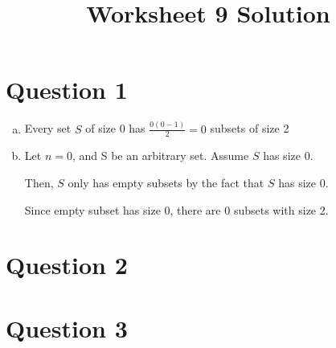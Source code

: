 \documentclass[12pt]{article}
\begin{document}
\title{Worksheet 9 Solution}
\maketitle

\section*{Question 1}
\begin{enumerate}[a.]
    \item

    Every set $S$ of size 0 has $\frac{0(0-1)}{2} = 0$ subsets of size 2

    \item

    Let $n = 0$, and S be an arbitrary set. Assume $S$ has size 0.

    \bigskip

    Then, $S$ only has empty subsets by the fact that $S$ has size 0.

    \bigskip

    Since empty subset has size 0, there are 0 subsets with size 2.
\end{enumerate}

\section*{Question 2}

\section*{Question 3}
\end{document}
